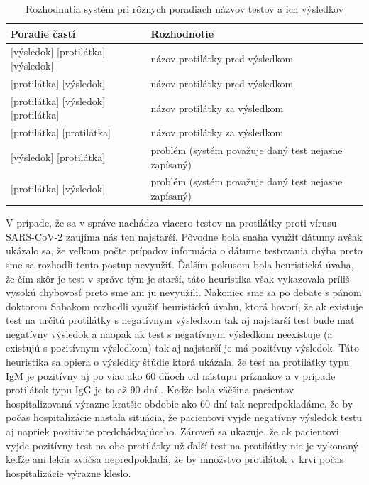 \begin{table}[]
	\caption[Rozhodia systému pri testoch]{Rozhodnutia systém pri rôznych poradiach názvov testov a ich výsledkov}
	\label{tab:proti}
	\begin{tabular}{|p{8cm}|p{6.7cm}|}
		\hline
		\textbf{Poradie častí}                          & \textbf{Rozhodnotie}                                                                                             \\ \hline
		[protilátka] [výsledok] [protilátka] [výsledok] & názov protilátky pred výsledkom                                                                        \\ \hline
		[protilátka] [protilátka] [výsledok]            & názov protilátky pred výsledkom                                                                        \\ \hline
		[výsledok] [protilátka] [výsledok] [protilátka] & názov protilátky za výsledkom                                                                          \\ \hline
		[výsledok] [protilátka] [protilátka]            & názov protilátky za výsledkom                                                                          \\ \hline
		[protilátka] [výsledok] [protilátka]            & problém (systém považuje daný test nejasne zapísaný)          \\ \hline
		[výsledok] [protilátka] [výsledok]              & problém (systém považuje daný test nejasne zapísaný) \\ \hline
	\end{tabular}
\end{table}

V prípade, že sa v správe nachádza viacero testov na protilátky proti vírusu SARS-CoV-2 zaujíma nás ten najstarší. Pôvodne bola snaha využiť dátumy avšak ukázalo sa, že veľkom počte prípadov informácia o dátume testovania chýba preto sme sa rozhodli tento postup nevyužiť. Ďalším pokusom bola heuristická úvaha, že čím skôr je test v správe tým je starší, táto heuristika však vykazovala príliš vysokú chybovosť preto sme ani ju nevyužili. Nakoniec sme sa po debate s pánom doktorom Sabakom rozhodli využiť heuristickú úvahu, ktorá hovorí, že ak existuje test na určitú protilátky s negatívnym výsledkom tak aj najstarší test bude mať negatívny výsledok a naopak ak test s negatívnym výsledkom neexistuje (a existujú s pozitívnym výsledkom) tak aj najstarší je má pozitívny výsledok. Táto heuristika sa opiera o výsledky štúdie ktorá ukázala, že test na protilátky typu IgM je pozitívny aj po viac ako 60 dňoch od nástupu príznakov a v prípade protilátok typu IgG je to až 90 dní \cite{antibodies}. Keďže bola väčšina pacientov hospitalizovaná výrazne kratšie obdobie ako 60 dní tak nepredpokladáme, že by počas hospitalizácie nastala situácia, že pacientovi vyjde negatívny výsledok testu aj napriek pozitivite predchádzajúceho. Zároveň sa ukazuje, že ak pacientovi vyjde pozitívny test na obe protilátky už ďalší test na protilátky nie je vykonaný keďže ani lekár zväčša nepredpokladá, že by množstvo protilátok v krvi počas hospitalizácie výrazne kleslo.

